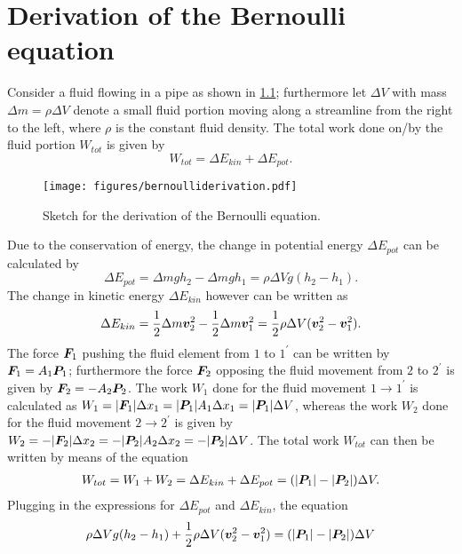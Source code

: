 \documentclass[a4paper,11pt]{report}
\begin{document}
\chapter{Derivation of the Bernoulli equation}
Consider a fluid flowing in a pipe as shown in \cref{fig:bernoulliderivation}; furthermore let $\Delta V$ with mass $\Delta m = \rho\Delta V$ denote a small fluid portion moving along a streamline from the right to the left, where $\rho$ is the constant fluid density. The total work done on/by the fluid portion  $W_{tot}$ is given by \begin{equation}
W_{tot} = \Delta E_{kin} + \Delta E_{pot}.
\end{equation}
\begin{figure}[h]
\centering
\texttt{[image: figures/bernoulliderivation.pdf]}
\caption{Sketch for the derivation of the Bernoulli equation.}
\label{fig:bernoulliderivation}
\end{figure} Due to the conservation of energy, the change in potential energy $\Delta E_{pot}$ can be calculated by \begin{equation}
\Delta E_{pot} = \Delta m g h_2 - \Delta m g h_1 = \rho \Delta V g (h_2-h_1).
\end{equation} The change in kinetic energy $\Delta E_{kin}$ however can be written as \begin{equation}
\Delta E_{kin} = \frac{1}{2}\Delta m \bm{v}_2^2 - \frac{1}{2}\Delta m \bm{v}_1^2 = \frac{1}{2}\rho \Delta V (\bm{v}_2^2-\bm{v}_1^2).
\end{equation} The force $\bm{F}_1$ pushing the fluid element from $1$ to $1^\prime$ can be written by  $\bm{F}_1 = A_1\bm{P}_1$; furthermore the force $\bm{F}_2$ opposing the fluid movement from $2$ to $2^\prime$ is given by $\bm{F}_2 = -A_2 \bm{P}_2$. The work $W_1$ done for the fluid movement $1\rightarrow 1^\prime$ is calculated as $W_1 = |\bm{F}_1|\Delta x_1 = |\bm{P}_1|A_1\Delta x_1 = |\bm{P}_1|\Delta V$, whereas the work $W_2$ done for the fluid movement $2\rightarrow 2^\prime$ is given by $W_2 = -|\bm{F}_2|\Delta x_2 = -|\bm{P}_2|A_2\Delta x_2 = -|\bm{P}_2|\Delta V$. The total work $W_{tot}$ can then be written by means of the equation \begin{gather}
W_{tot} = W_1 + W_2 = \Delta E_{kin} + \Delta E_{pot} = (|\bm{P}_1|-|\bm{P}_2|)\Delta V.
\end{gather} Plugging in the expressions for $\Delta E_{pot}$ and $\Delta E_{kin}$, the equation \begin{equation}
\rho \Delta V g (h_2-h_1) + \frac{1}{2}\rho \Delta V (\vect{v}_2^2 - \vect{v}_1^2) = (|\vect{P}_1|-|\vect{P}_2|)\Delta V

\end{equation}
\end{document}
